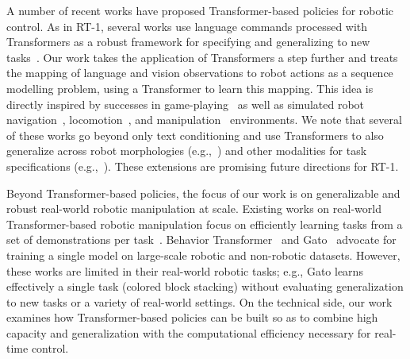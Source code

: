 \documentclass{article} %
\begin{document}
A number of recent works have proposed Transformer-based policies for robotic control. As in RT-1, several works use language commands processed with Transformers as a robust framework for specifying and generalizing to new tasks~\citep{zhang2021hierarchical,pashevich2021episodic,silva2021lancon,jang2022bc,ahn2022can,nair2022learning}.
Our work takes the application of Transformers a step further and treats the mapping of language and vision observations to robot actions as a sequence modelling problem, using a Transformer to learn this mapping. This idea is directly inspired by successes in game-playing~\citep{chen2021decision,lee2022multi} as well as simulated robot navigation~\citep{fang2019scene}, locomotion~\citep{janner2021reinforcement,gupta2022metamorph}, and manipulation~\citep{jiang2022vima} environments.  We note that several of these works go beyond only text conditioning and use Transformers to also generalize across robot morphologies (e.g.,~\citet{gupta2022metamorph}) and other modalities for task specifications (e.g.,~\citet{jang2022bc,jiang2022vima}). These extensions are promising future directions for RT-1.

Beyond Transformer-based policies, the focus of our work is on generalizable and robust real-world robotic manipulation at scale.
Existing works on real-world Transformer-based robotic manipulation focus on efficiently learning tasks from a set of demonstrations per task~\citep{shridhar2022perceiver}. Behavior Transformer~\citep{shafiullah2022behavior} and Gato~\citep{reed2022generalist} advocate for training a single model on large-scale robotic and non-robotic datasets. However, these works are limited in their real-world robotic tasks; e.g., Gato learns effectively a single task (colored block stacking) without evaluating generalization to new tasks or a variety of real-world settings. On the technical side, our work examines how Transformer-based policies can be built so as to combine high capacity and generalization with the computational efficiency necessary for real-time control.
\end{document}
